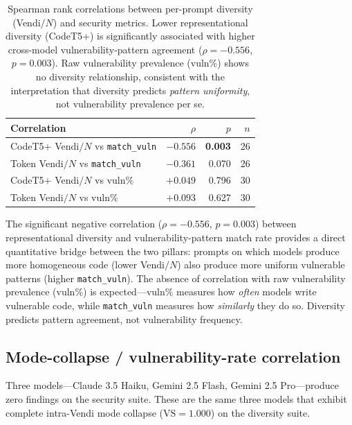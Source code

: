 \documentclass{article}
\begin{document}
\begin{table}[h]
\centering\small
\begin{tabular}{lrrr}
\toprule
Correlation & $\rho$ & $p$ & $n$ \\
\midrule
CodeT5+ Vendi$/N$ vs \texttt{match\_vuln} & $-0.556$ & \textbf{0.003} & 26 \\
Token Vendi$/N$ vs \texttt{match\_vuln}   & $-0.361$ & 0.070 & 26 \\
CodeT5+ Vendi$/N$ vs vuln\%               & $+0.049$ & 0.796 & 30 \\
Token Vendi$/N$ vs vuln\%                 & $+0.093$ & 0.627 & 30 \\
\bottomrule
\end{tabular}
\caption{Spearman rank correlations between per-prompt diversity (Vendi$/N$)
and security metrics. Lower representational diversity (CodeT5+) is
significantly associated with higher cross-model vulnerability-pattern
agreement ($\rho = -0.556$, $p = 0.003$). Raw vulnerability prevalence
(vuln\%) shows no diversity relationship, consistent with the interpretation
that diversity predicts \emph{pattern uniformity}, not vulnerability
prevalence per se.}
\label{tab:correlation}
\end{table}

The significant negative correlation ($\rho = -0.556$, $p = 0.003$) between
representational diversity and vulnerability-pattern match rate provides a
direct quantitative bridge between the two pillars: prompts on which models
produce more homogeneous code (lower Vendi$/N$) also produce more uniform
vulnerable patterns (higher \texttt{match\_vuln}). The absence of
correlation with raw vulnerability prevalence (vuln\%) is expected---vuln\%
measures how \emph{often} models write vulnerable code, while
\texttt{match\_vuln} measures how \emph{similarly} they do so. Diversity
predicts pattern agreement, not vulnerability frequency.

\subsection{Mode-collapse / vulnerability-rate correlation}
\label{sec:correlation}

Three models---Claude 3.5 Haiku, Gemini 2.5 Flash, Gemini 2.5
Pro---produce zero findings on the security suite. These are the same three
models that exhibit complete intra-Vendi mode collapse
($\mathrm{VS}=1.000$) on the diversity suite.
\end{document}
